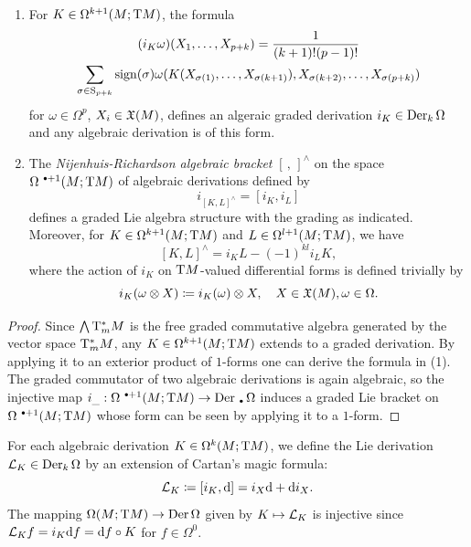 \begin{prop}
    \begin{enumerate}[label=(\alph*)]
        \item For $K\in \Omega^{k+1}(M;\mathrm{T} M)$, the formula 
        \begin{multline}
            (i_K\omega)(X_1,\ldots,X_{p+k})=\frac{1}{(k+1)!(p-1)!}\\\sum_{\sigma\in \mathrm{S}_{p+k}}\operatorname{sign}(\sigma) \omega(K(X_{\sigma(1)},\ldots,X_{\sigma(k+1)}),X_{\sigma(k+2)},\ldots,X_{\sigma(p+k)})
        \end{multline}
        for $\omega\in\Omega^p$, $X_i\in\mathfrak{X}(M)$, defines an algeraic graded derivation $i_K\in \operatorname{Der}_k\Omega$ and any algebraic derivation is of this form.
        \item The \emph{Nijenhuis-Richardson algebraic bracket} $[\,,\,]^{\wedge}$ on the space $\Omega^{\smbullet +1}(M;\T M)$ of algebraic derivations defined by 
        \[i_{[K,L]^{\wedge}}= [i_K,i_L]\]
        defines a graded Lie algebra structure with the grading as indicated. Moreover, for $K\in\Omega^{k+1}(M;\mathrm{T} M)$ and $L\in\Omega^{l+1}(M;\mathrm{T} M)$, we have 
        \[[K,L]^{\wedge}=i_K L-(-1)^{kl}i_L K,\]
        where the action of $i_K$ on $\mathrm{T} M$-valued differential forms is defined trivially by
        \[i_K(\omega\otimes X)\coloneqq i_K(\omega)\otimes X,\quad X\in\mathfrak{X}(M),\omega\in\Omega.\]
    \end{enumerate}
\end{prop}
\begin{proof}
    Since $\bigwedge \mathrm{T}^\ast_m M$ is the free graded commutative algebra generated by the vector space $\mathrm{T}^\ast_m M$, any $K\in \Omega^{k+1}(M;\mathrm{T} M)$ extends to a graded derivation. By applying it to an exterior product of $1$-forms one can derive the formula in (1). The graded commutator of two algebraic derivations is again algebraic, so the injective map $i_{\_}:\Omega^{\smbullet +1}(M;\T M)\to \Der_{\smbullet}\Omega$ induces a graded Lie bracket on $\Omega^{\smbullet+1}(M;\T M)$ whose form can be seen by applying it to a $1$-form.
\end{proof}


\begin{defn}
    For each algebraic derivation $K\in\Omega^k(M;\mathrm{T} M)$, we define the Lie derivation $\mathcal{L}_K\in\operatorname{Der}_k\Omega$ by an extension of Cartan's magic formula:
    \[\mathcal{L}_K\coloneqq [i_K,{\mathrm{d}}]=i_X{\mathrm{d}}+{\mathrm{d}} i_X.\]
    The mapping $\Omega(M;\mathrm{T} M)\to \operatorname{Der}\Omega$ given by $K\mapsto \mathcal{L}_K$ is injective since $\mathcal{L}_K f=i_K{\mathrm{d}} f={\mathrm{d}} f\circ K$ for $f\in\Omega^0$.
\end{defn}

